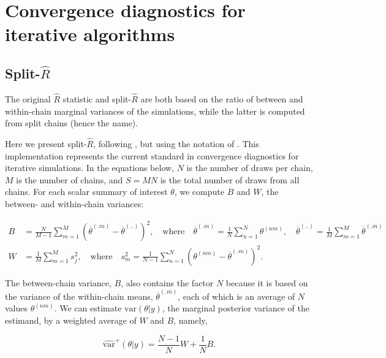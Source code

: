 \documentclass[american,]{article}
\begin{document}
\hypertarget{CD}{%
\section{Convergence diagnostics for iterative algorithms}\label{CD}}


\hypertarget{SplitRhat}{%
\subsection{Split-$\widehat{R}$}\label{SplitRhat}}


The original \(\widehat{R}\) statistic
\citep{Gelman+Rubin:1992, Brooks+Gelman:1998} and
split-\(\widehat{R}\) \citep{BDA3} are both based on the ratio of
between and within-chain marginal variances of the simulations, while
the latter is computed from split chains (hence the name).

Here we present split-\(\widehat{R}\),
following \citet{BDA3}, but using the notation of
\citet{StanBook}. This implementation represents the current 
standard in convergence diagnostics for iterative simulations. In the
equations below, \(N\) is the number of draws per chain, \(M\) is the
number of chains, and \(S=MN\) is the total number of draws from all
chains. For each scalar summary of interest \(\theta\), we compute \(B\)
and \(W\), the between- and within-chain variances:

\begin{align}
B &= \frac{N}{M-1}\sum_{m=1}^{M}(\overline{\theta}^{(.m)} - 
\overline{\theta}^{(..)})^2, \quad \mbox{where} \quad 
\overline{\theta}^{(.m)}=\frac{1}{N}\sum_{n=1}^N \theta^{(nm)}, \quad
\overline{\theta}^{(..)} = \frac{1}{M}\sum_{m=1}^M\overline{\theta}^{(.m)} 
\\
W &= \frac{1}{M}\sum_{m=1}^{M}s_j^2, \quad \mbox{where} \quad
s_m^2=\frac{1}{N-1} \sum_{n=1}^N (\theta^{(nm)}-\overline{\theta}^{(.m)})^2.
\end{align}

The between-chain variance, \(B\), also contains the factor \(N\)
because it is based on the variance of the within-chain means,
\(\overline{\theta}^{(.m)}\), each of which is an average of \(N\)
values \(\theta^{(nm)}\). We can estimate \(\mbox{var}(\theta | y)\),
the marginal posterior variance of the estimand, by a weighted average
of \(W\) and \(B\), namely,

\begin{equation}
\widehat{\mbox{var}}^+(\theta| y) = \frac{N-1}{N}W + \frac{1}{N}B.
\end{equation}
\end{document}
